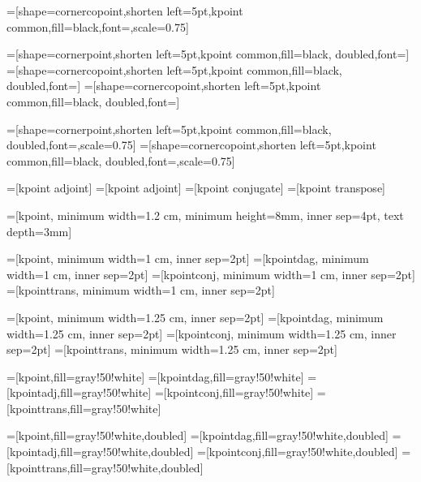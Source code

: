 =[shape=cornercopoint,shorten left=5pt,kpoint common,fill=black,font=\color{white},scale=0.75]

=[shape=cornerpoint,shorten left=5pt,kpoint common,fill=black, doubled,font=\color{white}]
=[shape=cornercopoint,shorten left=5pt,kpoint common,fill=black, doubled,font=\color{white}]
=[shape=cornercopoint,shorten left=5pt,kpoint common,fill=black, doubled,font=\color{white}]

=[shape=cornerpoint,shorten left=5pt,kpoint common,fill=black, doubled,font=\color{white},scale=0.75]
=[shape=cornercopoint,shorten left=5pt,kpoint common,fill=black, doubled,font=\color{white},scale=0.75]

=[kpoint adjoint]
=[kpoint adjoint]
=[kpoint conjugate]
=[kpoint transpose]

=[kpoint, minimum width=1.2 cm, minimum height=8mm, inner sep=4pt, text depth=3mm]

=[kpoint, minimum width=1 cm, inner sep=2pt]%
=[kpointdag, minimum width=1 cm, inner sep=2pt]%
=[kpointconj, minimum width=1 cm, inner sep=2pt]%
=[kpointtrans, minimum width=1 cm, inner sep=2pt]%

=[kpoint, minimum width=1.25 cm, inner sep=2pt]%
=[kpointdag, minimum width=1.25 cm, inner sep=2pt]%
=[kpointconj, minimum width=1.25 cm, inner sep=2pt]%
=[kpointtrans, minimum width=1.25 cm, inner sep=2pt]%

=[kpoint,fill=gray!50!white]
=[kpointdag,fill=gray!50!white]
=[kpointadj,fill=gray!50!white]
=[kpointconj,fill=gray!50!white]
=[kpointtrans,fill=gray!50!white]

=[kpoint,fill=gray!50!white,doubled]
=[kpointdag,fill=gray!50!white,doubled]
=[kpointadj,fill=gray!50!white,doubled]
=[kpointconj,fill=gray!50!white,doubled]
=[kpointtrans,fill=gray!50!white,doubled]

